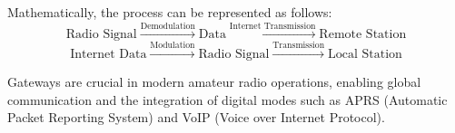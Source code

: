 Mathematically, the process can be represented as follows:
\begin{equation}
\text{Radio Signal} \xrightarrow{\text{Demodulation}} \text{Data} \xrightarrow{\text{Internet Transmission}} \text{Remote Station}
\end{equation}
\begin{equation}
\text{Internet Data} \xrightarrow{\text{Modulation}} \text{Radio Signal} \xrightarrow{\text{Transmission}} \text{Local Station}
\end{equation}

Gateways are crucial in modern amateur radio operations, enabling global communication and the integration of digital modes such as APRS (Automatic Packet Reporting System) and VoIP (Voice over Internet Protocol).

